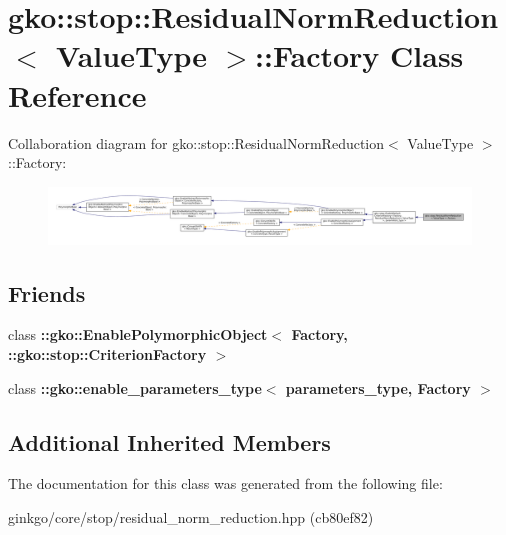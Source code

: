 \hypertarget{classgko_1_1stop_1_1ResidualNormReduction_1_1Factory}{}\section{gko\+:\+:stop\+:\+:Residual\+Norm\+Reduction$<$ Value\+Type $>$\+:\+:Factory Class Reference}
\label{classgko_1_1stop_1_1ResidualNormReduction_1_1Factory}


Collaboration diagram for gko\+:\+:stop\+:\+:Residual\+Norm\+Reduction$<$ Value\+Type $>$\+:\+:Factory\+:
\nopagebreak
\begin{figure}[H]
\begin{center}
\leavevmode
\includegraphics[width=350pt]{classgko_1_1stop_1_1ResidualNormReduction_1_1Factory__coll__graph}
\end{center}
\end{figure}
\subsection*{Friends}
\begin{DoxyCompactItemize}
\item 
\mbox{\label{classgko_1_1stop_1_1ResidualNormReduction_1_1Factory_aaa5507cf00e5361a77971746fefa42e6}} 
class {\bfseries \+::gko\+::\+Enable\+Polymorphic\+Object$<$ Factory, \+::gko\+::stop\+::\+Criterion\+Factory $>$}
\item 
\mbox{\label{classgko_1_1stop_1_1ResidualNormReduction_1_1Factory_a0d176cbd42d6214e11aee8c30ca256fc}} 
class {\bfseries \+::gko\+::enable\+\_\+parameters\+\_\+type$<$ parameters\+\_\+type, Factory $>$}
\end{DoxyCompactItemize}
\subsection*{Additional Inherited Members}


The documentation for this class was generated from the following file\+:\begin{DoxyCompactItemize}
\item 
ginkgo/core/stop/residual\+\_\+norm\+\_\+reduction.\+hpp (cb80ef82)\end{DoxyCompactItemize}
